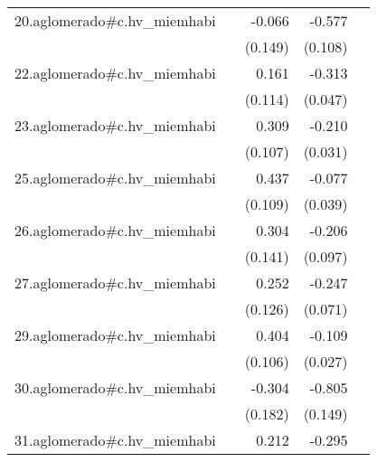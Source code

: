 {\begin{longtable}{l*{4}{D{.}{.}{-1}}}
\addlinespace
20.aglomerado#c.hv\_miemhabi&                     &      -0.066         &      -0.577\sym{***}&                     \\
            &                     &     (0.149)         &     (0.108)         &                     \\
\addlinespace
22.aglomerado#c.hv\_miemhabi&                     &       0.161         &      -0.313\sym{***}&                     \\
            &                     &     (0.114)         &     (0.047)         &                     \\
\addlinespace
23.aglomerado#c.hv\_miemhabi&                     &       0.309\sym{**} &      -0.210\sym{***}&                     \\
            &                     &     (0.107)         &     (0.031)         &                     \\
\addlinespace
25.aglomerado#c.hv\_miemhabi&                     &       0.437\sym{***}&      -0.077\sym{*}  &                     \\
            &                     &     (0.109)         &     (0.039)         &                     \\
\addlinespace
26.aglomerado#c.hv\_miemhabi&                     &       0.304\sym{*}  &      -0.206\sym{*}  &                     \\
            &                     &     (0.141)         &     (0.097)         &                     \\
\addlinespace
27.aglomerado#c.hv\_miemhabi&                     &       0.252\sym{*}  &      -0.247\sym{***}&                     \\
            &                     &     (0.126)         &     (0.071)         &                     \\
\addlinespace
29.aglomerado#c.hv\_miemhabi&                     &       0.404\sym{***}&      -0.109\sym{***}&                     \\
            &                     &     (0.106)         &     (0.027)         &                     \\
\addlinespace
30.aglomerado#c.hv\_miemhabi&                     &      -0.304         &      -0.805\sym{***}&                     \\
            &                     &     (0.182)         &     (0.149)         &                     \\
\addlinespace
31.aglomerado#c.hv\_miemhabi&                     &       0.212         &      -0.295\sym{***}&                     \\

\end{longtable}}
